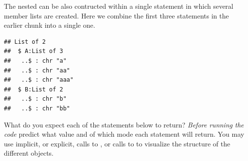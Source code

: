 \documentclass[krantz2]{krantz}\usepackage{knitr}%
\begin{document}
The nested can be also contructed within a single statement in which several member lists are created. Here we combine the first three statements in the earlier chunk into a single one.

\begin{knitrout}\footnotesize
{}\color{fgcolor}\begin{kframe}
\begin{alltt}
 \hlkwb{<-} \hlstd{(} \hlstd{=} \hlstd{(}\hlstd{,} \hlstd{,} \hlstd{),}  \hlstd{=} \hlstd{(}\hlstd{,} \hlstd{))}
\end{alltt}
\begin{verbatim}
## List of 2
##  $ A:List of 3
##   ..$ : chr "a"
##   ..$ : chr "aa"
##   ..$ : chr "aaa"
##  $ B:List of 2
##   ..$ : chr "b"
##   ..$ : chr "bb"
\end{verbatim}
\end{kframe}
\end{knitrout}

\begin{playground}
What do you expect each of the statements below to return? \emph{Before running the code} predict what value and of which mode each statement will return. You may use implicit, or explicit, calls to , or calls to  to visualize the structure of the different objects.

\begin{knitrout}\footnotesize
{}\color{fgcolor}\begin{kframe}
\begin{alltt}
 \hlkwb{<-} \hlstd{(} \hlstd{=} \hlstd{(}\hlstd{,} \hlstd{,} \hlstd{),}  \hlstd{=} \hlstd{(}\hlstd{,} \hlstd{))}
\hlstd{nested.list[}\hlopt{:}\hlstd{]}
\hlstd{nested.list[}\hlstd{]}
\hlstd{nested.list[[}\hlstd{]][}\hlstd{]}
\hlstd{nested.list[[}\hlstd{]][[}\hlstd{]]}
\hlstd{nested.list[}\hlstd{]}
\hlstd{nested.list[}\hlstd{][[}\hlstd{]]}
\end{alltt}
\end{kframe}
\end{knitrout}

\end{playground}
\end{document}
